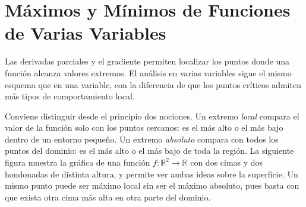 \section{Máximos y Mínimos de Funciones de Varias Variables}

Las derivadas parciales y el gradiente permiten localizar los puntos donde una función alcanza valores extremos. El análisis en varias variables sigue el mismo esquema que en una variable, con la diferencia de que los puntos críticos admiten más tipos de comportamiento local.

Conviene distinguir desde el principio dos nociones. Un extremo \emph{local} compara el valor de la función solo con los puntos cercanos: es el más alto o el más bajo dentro de un entorno pequeño. Un extremo \emph{absoluto} compara con todos los puntos del dominio: es el más alto o el más bajo de toda la región. La siguiente figura muestra la gráfica de una función $f: \mathbb{R}^2 \to \mathbb{R}$ con dos cimas y dos hondonadas de distinta altura, y permite ver ambas ideas sobre la superficie. Un mismo punto puede ser máximo local sin ser el máximo absoluto, pues basta con que exista otra cima más alta en otra parte del dominio.

